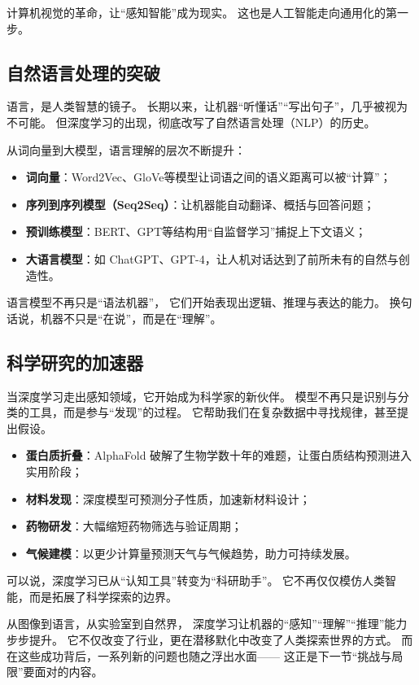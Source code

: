 计算机视觉的革命，让“感知智能”成为现实。  
这也是人工智能走向通用化的第一步。

\subsection{自然语言处理的突破}

语言，是人类智慧的镜子。  
长期以来，让机器“听懂话”“写出句子”，几乎被视为不可能。  
但深度学习的出现，彻底改写了自然语言处理（NLP）的历史。

从词向量到大模型，语言理解的层次不断提升：

\begin{itemize}
\item \textbf{词向量}：Word2Vec、GloVe等模型让词语之间的语义距离可以被“计算”；
\item \textbf{序列到序列模型（Seq2Seq）}：让机器能自动翻译、概括与回答问题；
\item \textbf{预训练模型}：BERT、GPT等结构用“自监督学习”捕捉上下文语义；
\item \textbf{大语言模型}：如 ChatGPT、GPT-4，让人机对话达到了前所未有的自然与创造性。
\end{itemize}

语言模型不再只是“语法机器”，  
它们开始表现出逻辑、推理与表达的能力。  
换句话说，机器不只是“在说”，而是在“理解”。

\subsection{科学研究的加速器}

当深度学习走出感知领域，它开始成为科学家的新伙伴。  
模型不再只是识别与分类的工具，而是参与“发现”的过程。  
它帮助我们在复杂数据中寻找规律，甚至提出假设。  

\begin{itemize}
\item \textbf{蛋白质折叠}：AlphaFold 破解了生物学数十年的难题，让蛋白质结构预测进入实用阶段；
\item \textbf{材料发现}：深度模型可预测分子性质，加速新材料设计；
\item \textbf{药物研发}：大幅缩短药物筛选与验证周期；
\item \textbf{气候建模}：以更少计算量预测天气与气候趋势，助力可持续发展。
\end{itemize}

可以说，深度学习已从“认知工具”转变为“科研助手”。  
它不再仅仅模仿人类智能，而是拓展了科学探索的边界。

从图像到语言，从实验室到自然界，  
深度学习让机器的“感知”“理解”“推理”能力步步提升。  
它不仅改变了行业，更在潜移默化中改变了人类探索世界的方式。  
而在这些成功背后，一系列新的问题也随之浮出水面——  
这正是下一节“挑战与局限”要面对的内容。

